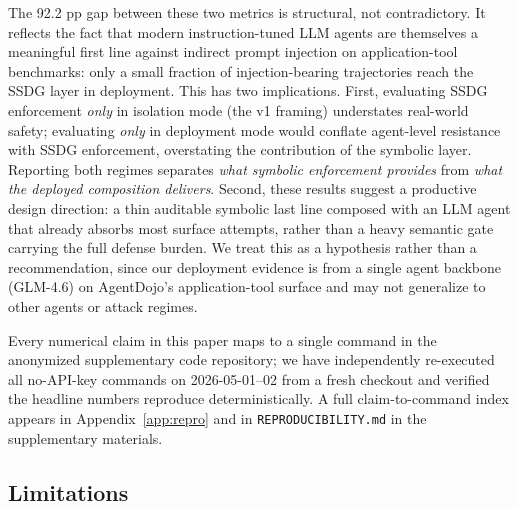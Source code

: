 \documentclass{article}
\theoremstyle{definition}
\begin{document}
The 92.2 pp gap between these two metrics is structural, not
contradictory. It reflects the fact that modern instruction-tuned LLM
agents are themselves a meaningful first line against indirect
prompt injection on application-tool benchmarks: only a small fraction
of injection-bearing trajectories reach the SSDG layer in deployment.
This has two implications. First, evaluating SSDG enforcement
\emph{only} in isolation mode (the v1 framing) understates real-world
safety; evaluating \emph{only} in deployment mode would conflate
agent-level resistance with SSDG enforcement, overstating the
contribution of the symbolic layer. Reporting both regimes separates
\emph{what symbolic enforcement provides} from \emph{what the deployed
composition delivers}. Second, these results
suggest a productive design direction: a thin auditable symbolic last
line composed with an LLM agent that already absorbs most surface
attempts, rather than a heavy semantic gate carrying the full defense
burden. We treat this as a hypothesis rather than a recommendation,
since our deployment evidence is from a single agent backbone
(GLM-4.6) on AgentDojo's application-tool surface and may not
generalize to other agents or attack regimes.

Every numerical claim in this paper maps to a single command in the
anonymized supplementary code repository; we have independently
re-executed all no-API-key commands on 2026-05-01--02 from a fresh
checkout and verified the headline numbers reproduce
deterministically. A full claim-to-command index appears in
Appendix~\ref{app:repro} and in \texttt{REPRODUCIBILITY.md} in the
supplementary materials.

\subsection{Limitations}
\label{subsec:limitations}
\end{document}
